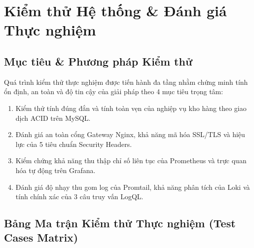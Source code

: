 \documentclass[12pt,a4paper,oneside]{report}
\begin{document}
\chapter{Kiểm thử Hệ thống \& Đánh giá Thực nghiệm}

\section{Mục tiêu \& Phương pháp Kiểm thử}
Quá trình kiểm thử thực nghiệm được tiến hành đa tầng nhằm chứng minh tính ổn định, an toàn và độ tin cậy của giải pháp theo 4 mục tiêu trọng tâm:
\begin{enumerate}
    \item Kiểm thử tính đúng đắn và tính toàn vẹn của nghiệp vụ kho hàng theo giao dịch ACID trên MySQL.
    \item Đánh giá an toàn cổng Gateway Nginx, khả năng mã hóa SSL/TLS và hiệu lực của 5 tiêu chuẩn Security Headers.
    \item Kiểm chứng khả năng thu thập chỉ số liên tục của Prometheus và trực quan hóa tự động trên Grafana.
    \item Đánh giá độ nhạy thu gom log của Promtail, khả năng phân tích của Loki và tính chính xác của 3 câu truy vấn LogQL.
\end{enumerate}

\section{Bảng Ma trận Kiểm thử Thực nghiệm (Test Cases Matrix)}
\end{document}
